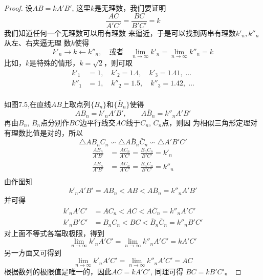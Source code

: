 \begin{proof}
设$AB=kA'B'$, 这里$k$是无理数，我们要证明
\[\frac{AC}{A'C'}=\frac{BC}{B'C'}=k\]
我们知道任何一个无理数可以用有理数
来逼近，于是可以找到两串有理数$k'_n,k''_n$从左、右夹逼无理
数$k$使得
\[k'_n\to k\leftarrow k''_n,\quad \text{或者}\quad \lim_{n\to\infty}k'_n=\lim_{n\to\infty}k''_n=k\]
比如，$k$是特殊的情形，$k=\sqrt{2}$，则可取
\[\begin{split}
    k'_1&=1,\quad     k'_2=1.4,\quad    k'_3=1.41,\;\ldots\\ 
    k''_1&=1,\quad     k''_2=1.5,\quad    k''_3=1.42,\;\ldots\\
\end{split}\]

\begin{figure}[htp]
    \centering
{}
    \caption{}
\end{figure}

如图7.5,在直线$AB$上取点列$\{B_n\}$和$\{\bar{B}_n\}$使得
\[AB_n=k'_nA'B',\qquad A\bar{B}_n=k''_n A'B'\]
再由$B_n$, $\bar{B}_n$点分别作$BC$边平行线交$AC$线于$C_n$, $\bar{C}_n$点，则因
为相似三角形定理对有理数比值是对的，所以
\[\triangle AB_nC_n\backsim \triangle A\bar{B}_n\bar{C}_n\backsim \triangle A'B'C'\]
\[\begin{split}
    \frac{AB_n}{A'B'}&=\frac{AC_n}{A'C'}=\frac{B_nC_n}{B'C'}=k'_n\\
    \frac{A\bar{B}_n}{A'B'}&=\frac{A\bar{C}_n}{A'C'}=\frac{\bar{B}_n\bar{C}_n}{B'C'}=k''_n\\
\end{split}\]
由作图知
\[k'_nA'B'=AB_n<AB<A\bar{B}_n=k''_nA'B'\]
并可得
\[\begin{split}
     k'_nA'C'&=AC_n<AC<A\bar{C}_n=k''_nA'C'\\
k'_nB'C'&=B_nC_n<BC<\bar{B}_n\bar{C}_n=k''_nB'C'
\end{split}\]
对上面不等式各端取极限，得到
\[\lim_{n\to\infty} k'_n A'C'  =  \lim_{n\to\infty}k''_n A'C'   =kA'C'\]
另一方面又可得到
\[\lim_{n\to\infty} k'_n A'C' = \lim_{n\to\infty}k''_n A'C'  =AC\]
根据数列的极限值是唯一的，因此$AC=kA'C'$, 同理可得
$BC=kB'C'$。
\end{proof}

